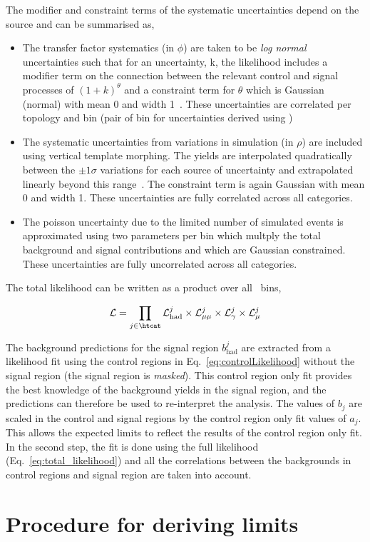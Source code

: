 The modifier and constraint terms of the systematic uncertainties depend on the source
and can be summarised as,
\begin{itemize}
\item The transfer factor systematics (in $\phi$) are taken to be \emph{log normal} uncertainties
such that for an uncertainty, k, the likelihood includes a modifier term on
the connection between the relevant control and signal processes of $(1+k)^{\theta}$ and a constraint term for $\theta$ which 
is Gaussian (normal) with mean 0 and width 1~\cite{templateMorphing}. These uncertainties 
are correlated per topology and \scalht bin (pair of \scalht bin for uncertainties derived using \mmj)
\item The systematic uncertainties from variations in simulation (in $\rho$) are included using vertical template morphing.
The yields are interpolated quadratically between the $\pm 1\sigma$ variations for each source of
uncertainty and extrapolated linearly beyond this range~\cite{templateMorphing}. The constraint term is again Gaussian
with mean 0 and width 1. These uncertainties are fully correlated across all categories.
\item The poisson uncertainty due to the limited number of simulated events is approximated using
two parameters per bin which multply the total background and signal contributions and which 
are Gaussian constrained. These uncertainties are fully uncorrelated across all categories.
\end{itemize}

The total likelihood can be written as a product over all \htcat~bins,

\begin{equation}
\mathcal{L} = \prod_{j\in\htcat} \mathcal{L}^{j}_{\mathrm{had}} \times \mathcal{L}^{j}_{\mathrm{\mu\mu}} \times \mathcal{L}^{j}_{\mathrm{\gamma}} \times \mathcal{L}^{j}_{\mathrm{\mu}}
\end{equation}

The background predictions for the signal region $b^{j}_{\mathrm{had}}$ are extracted from a likelihood fit 
using the control regions in Eq.~\ref{eq:controlLikelihood} without the signal region (the signal region is \emph{masked}). 
This control region only fit provides the best knowledge of the background yields in the signal region, 
and the predictions can therefore be used to re-interpret the analysis. The values of $b_j$ are 
scaled in the control and signal regions by the control region only fit values of $a_j$.
This allows the expected limits to reflect the results of the control region only fit.
In the second step, the fit is done using the full likelihood (Eq.~\ref{eq:total_likelihood}) and all 
the correlations between the backgrounds in control regions and signal region are taken into account.

\section{Procedure for deriving limits}
